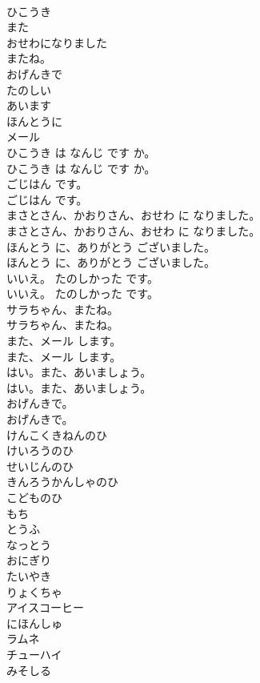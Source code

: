 \documentclass[8pt]{extreport}
\begin{document}
\begin{CJK}{UTF8}{min}
\\	ひこうき
\\	また
\\	おせわになりました
\\	またね。
\\	おげんきで
\\	たのしい
\\	あいます
\\	ほんとうに
\\	メール
\\	ひこうき は なんじ です か。	
\\	ひこうき は なんじ です か。 
\\	ごじはん です。	
\\	ごじはん です。 
\\	まさとさん、かおりさん、おせわ に なりました。	
\\	まさとさん、かおりさん、おせわ に なりました。 
\\	ほんとう に、ありがとう ございました。	
\\	ほんとう に、ありがとう ございました。 
\\	いいえ。 たのしかった です。	
\\	いいえ。 たのしかった です。 
\\	サラちゃん、またね。	
\\	サラちゃん、またね。 
\\	また、メール します。	
\\	また、メール します。 
\\	はい。また、あいましょう。	
\\	はい。また、あいましょう。 
\\	おげんきで。	
\\	おげんきで。 
\\	けんこくきねんのひ
\\	けいろうのひ
\\	せいじんのひ
\\	きんろうかんしゃのひ
\\	こどものひ
\\	もち
\\	とうふ
\\	なっとう
\\	おにぎり
\\	たいやき
\\	りょくちゃ
\\	アイスコーヒー
\\	にほんしゅ
\\	ラムネ
\\	チューハイ
\\	みそしる

\end{CJK}
\end{document}
